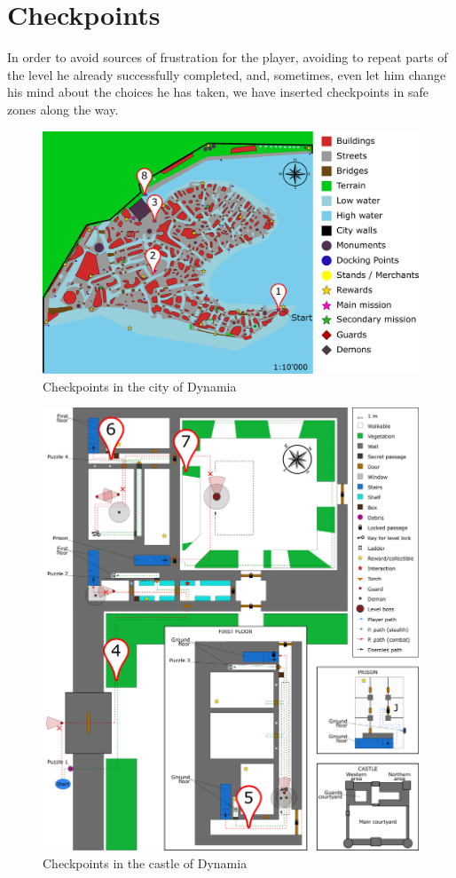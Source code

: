 \section{Checkpoints}

In order to avoid sources of frustration for the player, avoiding to repeat parts of the level he already successfully completed, and, sometimes, even let him change his mind about the choices he has taken, we have inserted checkpoints in safe zones along the way.
\begin{figure}[H]
  \centering
  \includegraphics[scale=0.47]{Images/Maps/dynamiaCheckpoints}
  \caption{Checkpoints in the city of Dynamia}
\end{figure}
\begin{figure}[H]
  \centering
  \includegraphics[scale=0.2]{Images/Maps/castleOfDynamiaCheckpoints}
  \caption{Checkpoints in the castle of Dynamia}
\end{figure}

